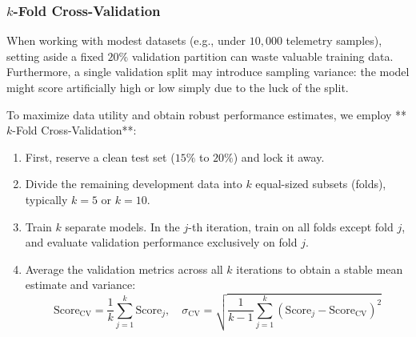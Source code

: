 \subsubsection{$k$-Fold Cross-Validation}
When working with modest datasets (e.g., under $10{,}000$ telemetry samples), setting aside a fixed $20\%$ validation partition can waste valuable training data. Furthermore, a single validation split may introduce sampling variance: the model might score artificially high or low simply due to the luck of the split.

To maximize data utility and obtain robust performance estimates, we employ **$k$-Fold Cross-Validation**:
\begin{enumerate}
    \item First, reserve a clean test set ($15\%$ to $20\%$) and lock it away.
    \item Divide the remaining development data into $k$ equal-sized subsets (folds), typically $k = 5$ or $k = 10$.
    \item Train $k$ separate models. In the $j$-th iteration, train on all folds except fold $j$, and evaluate validation performance exclusively on fold $j$.
    \item Average the validation metrics across all $k$ iterations to obtain a stable mean estimate and variance:
    \begin{equation}
    \text{Score}_{\text{CV}} = \frac{1}{k} \sum_{j=1}^{k} \text{Score}_j, \quad \sigma_{\text{CV}} = \sqrt{\frac{1}{k-1} \sum_{j=1}^{k} (\text{Score}_j - \text{Score}_{\text{CV}})^2}\label{eq:kfold_cv_mean}
    \end{equation}
\end{enumerate}

